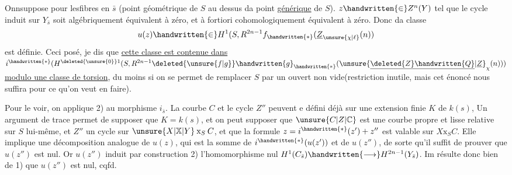 Onnsuppose   pour lesfibres en $\bar s$ (point géométrique  de $S$ au dessus da point \uline{générique} de $S$).   $z\handwritten{\in}Z^n(Y)$ tel que le cycle induit sur $Y_{\bar s}$ soit algébriquement équivalent à zéro, et à fortiori cohomologiquement équivalent à zéro. Donc da classe
\[
u(z)\handwritten{\in}H^1(S,R^{2n-1}f_{\handwritten{*}}(\underline{Z}_{\unsure{\chi|\ell}}(n))
\]
est définie. Ceci posé, je dis que \uline{cette classe est  contenue dans} $i^{\handwritten{*}}(H^{\deleted{\unsure{0}}1}(S,R^{2n-1}\deleted{\unsure{f|g}}\handwritten{g}_{\handwritten{*}}(\unsure{\underline{\deleted{Z}\handwritten{Q}}|\underline{Z}}_{\chi}(n)))$ \uline{modulo une classe de torsion}, du moins si on    se permet de remplacer $S$ par un ouvert non vide(restriction  inutile, mais cet énoncé nous suffira pour ce qu'on veut en faire).

Pour le voir, on applique 2) au morphisme $i_{\bar s}$. La courbe $C$ et le cycle $Z''$ peuvent e défini déjà sur une extension finie $K$ de $k(s)$, Un argument de trace permet de supposer que $K=k(s)$, et  on peut supposer que $\unsure{C|Z|\mathbb{C}}$  est une courbe propre et lisse relative sur $S$ lui-même, et $Z''$ un cycle sur $\unsure{X|\mathbb{X}|Y}\mathbin{\mathrm{x}}_S C$,  et que la formule $z=i^{\handwritten{*}}(z')+z''$ est valable sur $X\mathbin{\mathrm{x}}_S C$. Elle implique une décomposition analogue de $u(z)$, qui est la somme de $i^{\handwritten{*}}(u(z'))$ et de $u(z'')$, de sorte qu'il suffit de prouver que $u(z'')$ est nul. Or $u(z'')$ induit par construction 2) l'homomorphisme nul $H^1(C_{\bar s})\handwritten{\longrightarrow}H^{2n-1}(Y_{\bar s})$. Im résulte donc bien de 1) que $u(z'')$ est nul, cqfd.

